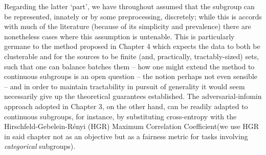 Regarding the latter `part', we have throughout assumed that the subgroup can be represented,
innately or by some preprocessing, discretely; while this is accords with much of the literature
(because of its simplicity and prevalence) there are nonetheless cases where this assumption is
untenable.
%
This is particularly germane to the method proposed in Chapter 4 which expects the data to both be
clusterable and for the sources to be finite (and, practically, tractably-sized) sets, such that
one can balance batches \wrt{} them -- how one might extend the method to continuous subgroups is
an open question -- the notion perhaps not even sensible -- and in order to maintain tractability
in pursuit of generality it would seem necessarily give up the theoretical guarantees established.
%
The adversarial-infomin approach adopted in Chapter 3, on the other hand, can be readily adapted to
continuous subgroups, for instance, by substituting cross-entropy with the
Hirschfeld-Gebelein-R\'enyi (HGR) Maximum Correlation Coefficient(we use HGR in said chapter not as
an objective but as a fairness metric for tasks involving \emph{categorical} subgroups).

